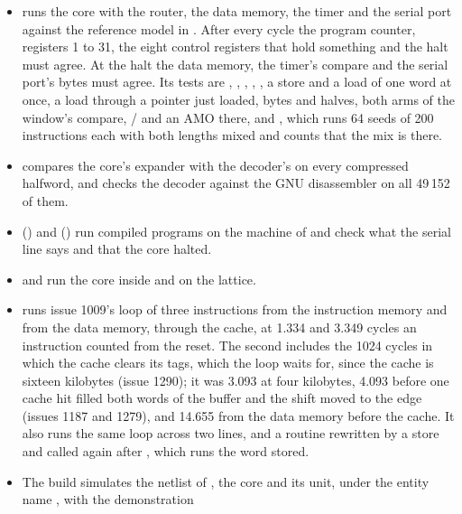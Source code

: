 \begin{itemize}
\item {} runs the core with the router, the
data memory, the timer and the serial port against the reference model
in . After every cycle the program counter, registers
1 to 31, the eight control registers that hold something and the halt
must agree. At the
halt the data memory, the timer's compare and the serial port's bytes
must agree. Its tests are ,
,
, ,
, a store and a load of
one word at once, a load through a pointer just loaded, bytes and
halves, both arms of the window's compare, / and an
AMO there, and , which
runs 64 seeds of 200 instructions each with both lengths mixed and
counts that the mix is there.
\item {} compares the core's expander with
the decoder's on every compressed halfword, and
 checks the decoder against the
GNU disassembler on all 49\,152 of them.
\item {} ()
and 
() run compiled programs on the machine
of  and check what the serial line says and that the core
halted.
\item {} and  run
the core inside  and on the lattice.
\item {} runs issue 1009's loop of three
instructions from the instruction memory and from the data memory,
through the cache, at 1.334 and 3.349 cycles an instruction counted
from the reset. The second includes the 1024 cycles in which the cache
clears its tags, which the loop waits for, since the cache is sixteen
kilobytes (issue 1290); it was 3.093 at four kilobytes, 4.093 before
one cache hit filled both words of the buffer and the shift moved to
the edge (issues 1187 and 1279), and 14.655 from the data memory
before the cache. It also runs the same loop across two lines, and a
routine rewritten by a store and called again after
, which runs the word stored.
\item The build simulates the netlist of , the core and its
unit, under the entity name , with the demonstration

\end{itemize}
